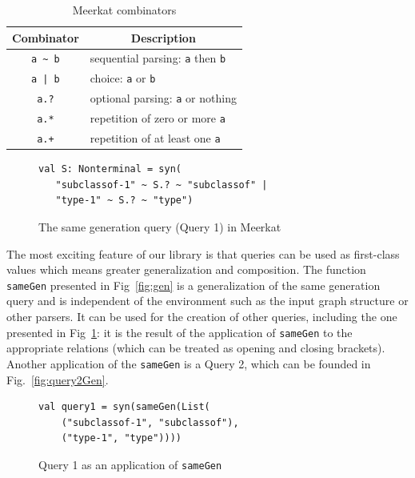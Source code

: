 \begin{table}[h]
\centering
\begin{tabular}{c|l}
\multicolumn{1}{c|}{Combinator} & \multicolumn{1}{|c}{Description} \\ \hline
{\lstinline!a ~ b!} & sequential parsing: {\lstinline!a!} then {\lstinline!b!}   \\
{\lstinline!a | b!} & choice: {\lstinline!a!} or {\lstinline!b!}         \\
{\lstinline!a.?!}   & optional parsing: {\lstinline!a!} or nothing   \\
{\lstinline!a.*!}   & repetition of zero or more {\lstinline!a!} \\
{\lstinline!a.+!}   & repetition of at least one {\lstinline!a!} \\
\end{tabular}
\caption{Meerkat combinators}
\label{table:combinators}
\end{table}


\begin{figure}[h]
\begin{lstlisting}
val S: Nonterminal = syn(
   "subclassof-1" ~ S.? ~ "subclassof" |
   "type-1" ~ S.? ~ "type")
\end{lstlisting}
\caption{The same generation query (Query 1) in Meerkat}
\label{fig:query1Meerkat}
\end{figure}


The most exciting feature of our library is that queries can be used as first-class values which means greater generalization and composition. 
The function \lstinline{sameGen} presented in Fig~\ref{fig:gen} is a generalization of the same generation query and is independent of the environment such as the input graph structure or other parsers.
It can be used for the creation of other queries, including the one presented in Fig~\ref{fig:query1Meerkat}: it is the result of the application of \lstinline{sameGen} to the appropriate relations (which can be treated as opening and closing brackets).
Another application of the \lstinline{sameGen} is a Query 2, which can be founded in Fig.~\ref{fig:query2Gen}.

\begin{figure}[h]
\begin{lstlisting}
val query1 = syn(sameGen(List(
    ("subclassof-1", "subclassof"),
    ("type-1", "type"))))
\end{lstlisting}
\caption{Query 1 as an application of \lstinline{sameGen}}
\label{fig:query1Gen}
\end{figure}

